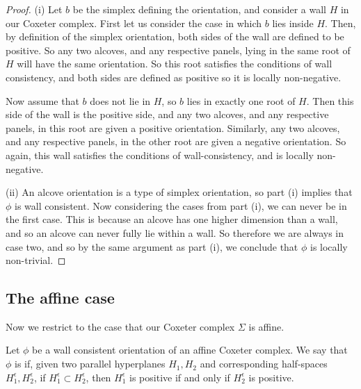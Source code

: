 \documentclass[11pt]{article}
\begin{document}
\begin{proof}
    (i) Let $b$ be the simplex defining the orientation, and consider a wall $H$ in our Coxeter complex. First let us consider the case in which $b$ lies inside $H$. Then, by definition of the simplex orientation, both sides of the wall are defined to be positive. So any two alcoves, and any respective panels, lying in the same root of $H$ will have the same orientation. So this root satisfies the conditions of wall consistency, and both sides are defined as positive so it is locally non-negative. 
    
    Now assume that $b$ does not lie in $H$, so $b$ lies in exactly one root of $H$. Then this side of the wall is the positive side, and any two alcoves, and any respective panels, in this root are given a positive orientation. Similarly, any two alcoves, and any respective panels, in the other root are given a negative orientation. So again, this wall satisfies the conditions of wall-consistency, and is locally non-negative. 

    (ii) An alcove orientation is a type of simplex orientation, so part (i) implies that $\phi$ is wall consistent. Now considering the cases from part (i), we can never be in the first case. This is because an alcove has one higher dimension than a wall, and so an alcove can never fully lie within a wall. So therefore we are always in case two, and so by the same argument as part (i), we conclude that $\phi$ is locally non-trivial. 
\end{proof}

\subsection{The affine case}

Now we restrict to the case that our Coxeter complex $\Sigma$ is affine. %



\begin{definition}
    Let $\phi$ be a wall consistent orientation of an affine Coxeter complex. We say that $\phi$ is  if, given two parallel hyperplanes $H_1,H_2$ and corresponding half-spaces $H_1^{\epsilon},H_2^{\epsilon}$, if $H_1^{\epsilon}\subset H_2^{\epsilon}$, then $H_1^{\epsilon}$ is positive if and only if $H_2^{\epsilon}$ is positive. 
\end{definition}
\end{document}

